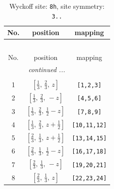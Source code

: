 \documentclass[fleqn,8pt]{jsarticle}
\begin{document}
\begin{longtable}{ccc}
\caption{Wyckoff site: {\tt 8h}, site symmetry: {\tt 3..}}
 \\
 \hline \hline
No. & position & mapping \\ \hline \endfirsthead

\multicolumn{2}{l}{\tablename\ \thetable{}} \\
 \hline \hline
No. & position & mapping \\ \hline \endhead

 \hline \hline
\multicolumn{2}{r}{\footnotesize\it continued ...} \\ \endfoot

 \hline \hline
\multicolumn{2}{r}{} \\ \endlastfoot

1 & $\left[ \frac{1}{3},\, \frac{2}{3},\, z \right]$ & {\tt [1,2,3]} \\ \hline
2 & $\left[ \frac{1}{3},\, \frac{2}{3},\, - z \right]$ & {\tt [4,5,6]} \\ \hline
3 & $\left[ \frac{1}{3},\, \frac{2}{3},\, \frac{1}{2} - z \right]$ & {\tt [7,8,9]} \\ \hline
4 & $\left[ \frac{1}{3},\, \frac{2}{3},\, z + \frac{1}{2} \right]$ & {\tt [10,11,12]} \\ \hline
5 & $\left[ \frac{2}{3},\, \frac{1}{3},\, z + \frac{1}{2} \right]$ & {\tt [13,14,15]} \\ \hline
6 & $\left[ \frac{2}{3},\, \frac{1}{3},\, \frac{1}{2} - z \right]$ & {\tt [16,17,18]} \\ \hline
7 & $\left[ \frac{2}{3},\, \frac{1}{3},\, - z \right]$ & {\tt [19,20,21]} \\ \hline
8 & $\left[ \frac{2}{3},\, \frac{1}{3},\, z \right]$ & {\tt [22,23,24]} \\
\end{longtable}
\renewcommand{\arraystretch}{1.2}
\end{document}
